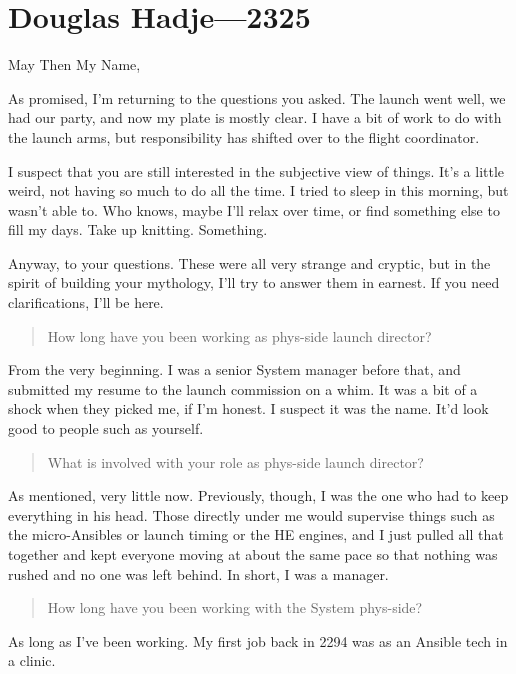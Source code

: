 \hypertarget{douglas-hadje-2325}{%
\chapter{Douglas Hadje—2325}\label{douglas-hadje-2325}}

May Then My Name,

As promised, I'm returning to the questions you asked. The launch went well, we had our party, and now my plate is mostly clear. I have a bit of work to do with the launch arms, but responsibility has shifted over to the flight coordinator.

I suspect that you are still interested in the subjective view of things. It's a little weird, not having so much to do all the time. I tried to sleep in this morning, but wasn't able to. Who knows, maybe I'll relax over time, or find something else to fill my days. Take up knitting. Something.

Anyway, to your questions. These were all very strange and cryptic, but in the spirit of building your mythology, I'll try to answer them in earnest. If you need clarifications, I'll be here.

\begin{quote}
How long have you been working as phys-side launch director?
\end{quote}

\noindent From the very beginning. I was a senior System manager before that, and submitted my resume to the launch commission on a whim. It was a bit of a shock when they picked me, if I'm honest. I suspect it was the name. It'd look good to people such as yourself.

\begin{quote}
What is involved with your role as phys-side launch director?
\end{quote}

\noindent As mentioned, very little now. Previously, though, I was the one who had to keep everything in his head. Those directly under me would supervise things such as the micro-Ansibles or launch timing or the HE engines, and I just pulled all that together and kept everyone moving at about the same pace so that nothing was rushed and no one was left behind. In short, I was a manager.

\begin{quote}
How long have you been working with the System phys-side?
\end{quote}

\noindent As long as I've been working. My first job back in 2294 was as an Ansible tech in a clinic.

